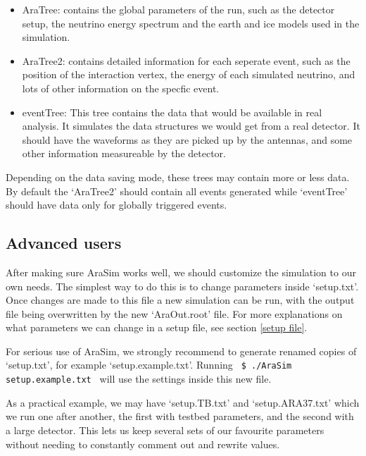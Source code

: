 \documentclass[a4paper,10pt]{article}
\newcommand{\room}{\vspace{0.3cm}}
\newcommand{\arasim}{AraSim\xspace}
\begin{document}
\begin{itemize}

 \item AraTree: contains the global parameters of the run, such as the detector setup, the neutrino energy spectrum and the earth and ice models used in the simulation. 
 
 \item AraTree2: contains detailed information for each seperate event, such as the position of the interaction vertex, the energy of each simulated neutrino, and lots of other information on the specfic event. 
 
 \item eventTree: This tree contains the data that would be available in real analysis. It simulates the data structures we would get from a real detector. It should have the waveforms as they are picked up by the antennas, and some other information measureable by the detector. 
 
 
\end{itemize}

Depending on the data saving mode, these trees may contain more or less data. By default the `AraTree2' should contain all events generated while `eventTree' should have data only for globally triggered events. 

\room

\subsection{Advanced users}\label{advanced users}

After making sure \arasim works well, we should customize the simulation to our own needs. The simplest way to do this is to change parameters inside `setup.txt'. Once changes are made to this file a new simulation can be run, with the output file being overwritten by the new `AraOut.root' file. For more explanations on what parameters we can change in a setup file, see section \ref{setup file}.

For serious use of \arasim, we strongly recommend to generate renamed copies of `setup.txt', for example `setup.example.txt'. Running \verb| $ ./AraSim setup.example.txt | will use the settings inside this new file. 

As a practical example, we may have `setup.TB.txt' and `setup.ARA37.txt' which we run one after another, the first with testbed parameters, and the second with a large detector. This lets us keep several sets of our favourite parameters without needing to constantly comment out and rewrite values. 
\end{document}
